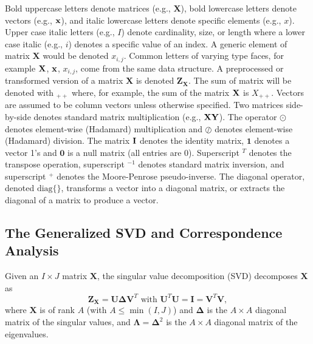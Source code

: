 \documentclass[12pt]{article}
\begin{document}
Bold uppercase letters denote matrices (e.g., \(\mathbf{X}\)), bold
lowercase letters denote vectors (e.g., \(\bf{x}\)), and italic
lowercase letters denote specific elements (e.g., \(x\)). Upper case
italic letters (e.g., \(I\)) denote cardinality, size, or length where a
lower case italic (e.g., \(i\)) denotes a specific value of an index. A
generic element of matrix \(\mathbf{X}\) would be denoted \(x_{i,j}\).
Common letters of varying type faces, for example \({\bf X}\),
\(\bf{x}\), \(x_{i,j}\), come from the same data structure. A
preprocessed or transformed version of a matrix \({\mathbf X}\) is
denoted \({\mathbf Z}_{\mathbf X}\). The sum of matrix will be denoted
with \(_{++}\) where, for example, the sum of the matrix \({\bf X}\) is
\(X_{++}\). Vectors are assumed to be column vectors unless otherwise
specified. Two matrices side-by-side denotes standard matrix
multiplication (e.g., \(\bf{X}\bf{Y}\)). The operator \(\odot\) denotes
element-wise (Hadamard) multiplication and \(\oslash\) denotes
element-wise (Hadamard) division. The matrix \({\bf I}\) denotes the
identity matrix, \(\mathbf{1}\) denotes a vector 1's and \({\mathbf 0}\)
is a null matrix (all entries are \(0\)). Superscript \(^{T}\) denotes
the transpose operation, superscript \(^{-1}\) denotes standard matrix
inversion, and superscript \(^{+}\) denotes the Moore-Penrose
pseudo-inverse. The diagonal operator, denoted \(\mathrm{diag\{\}}\),
transforms a vector into a diagonal matrix, or extracts the diagonal of
a matrix to produce a vector.

\hypertarget{the-generalized-svd-and-correspondence-analysis}{%
\subsection{The Generalized SVD and Correspondence
Analysis}\label{the-generalized-svd-and-correspondence-analysis}}

\label{section:GSVDCA}

Given an \(I \times J\) matrix \({\mathbf X}\), the singular value
decomposition (SVD) decomposes \({\mathbf X}\) as
\begin{equation}\label{eq:svd}
{\mathbf Z}_{\mathbf X} = 
{\mathbf U} {\boldsymbol \Delta} {\mathbf V}^{T}
\textrm{ with } {\mathbf U}^{T}{\mathbf U} 
= {\mathbf I} = {\mathbf V}^{T}{\mathbf V},
\end{equation} where \({\mathbf X}\) is of rank \(A\) (with
\(A \leq \min(I,J)\)) and \({\boldsymbol \Delta}\) is the \(A \times A\)
diagonal matrix of the singular values, and
\({\boldsymbol \Lambda} = {\boldsymbol \Delta}^2\) is the \(A \times A\)
diagonal matrix of the eigenvalues.
\end{document}
